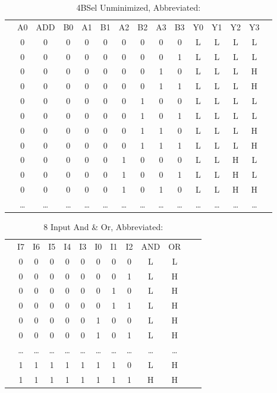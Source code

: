 \documentclass[letterpaper,titlepage,oneside]{article}
\begin{document}
\begin{table}[h!]
\begin{center}

\caption{4BSel Unminimized, Abbreviated: }\label{table:4BSel_Unminimized}
\begin{tabular}{c|c|c|c|c|c|c|c|c|c|c|c|c|c|c}
\cline{2-14}
 & A0 & ADD & B0 & A1 & B1 & A2 & B2 & A3 & B3 & Y0 & Y1 & Y2 & Y3 &  \\ \cline{2-14}

 & 0 & 0 & 0 & 0 & 0 & 0 & 0 & 0 & 0 & L & L & L & L\\
 & 0 & 0 & 0 & 0 & 0 & 0 & 0 & 0 & 1 & L & L & L & L\\
 & 0 & 0 & 0 & 0 & 0 & 0 & 0 & 1 & 0 & L & L & L & H\\
 & 0 & 0 & 0 & 0 & 0 & 0 & 0 & 1 & 1 & L & L & L & H\\
 & 0 & 0 & 0 & 0 & 0 & 0 & 1 & 0 & 0 & L & L & L & L\\
 & 0 & 0 & 0 & 0 & 0 & 0 & 1 & 0 & 1 & L & L & L & L\\
 & 0 & 0 & 0 & 0 & 0 & 0 & 1 & 1 & 0 & L & L & L & H\\
 & 0 & 0 & 0 & 0 & 0 & 0 & 1 & 1 & 1 & L & L & L & H\\
 & 0 & 0 & 0 & 0 & 0 & 1 & 0 & 0 & 0 & L & L & H & L\\
 & 0 & 0 & 0 & 0 & 0 & 1 & 0 & 0 & 1 & L & L & H & L\\
 & 0 & 0 & 0 & 0 & 0 & 1 & 0 & 1 & 0 & L & L & H & H\\
 & \ldots{} & \ldots{} & \ldots{} & \ldots{} & \ldots{} & \ldots{} & %
\ldots{} & \ldots{} & \ldots{} & \ldots{} & \ldots{} & \ldots{} & \ldots{} &\\
\cline{2-14}
\end{tabular}
\end{center}
\end{table}

\begin{table}[h!]
\begin{center}
\caption{8 Input And \& Or, Abbreviated: }\label{8AndOr_Unminimized}
\begin{tabular}{c|c|c|c|c|c|c|c|c|c|c|c|c}
\cline{2-11}
& I7 & I6 & I5 & I4 & I3 & I0 & I1 & I2 & AND & OR \\ 
\cline{2-11}
& 0 & 0 & 0 & 0 & 0 & 0 & 0 & 0 & L & L  \\  
& 0 & 0 & 0 & 0 & 0 & 0 & 0 & 1 & L & H \\
& 0 & 0 & 0 & 0 & 0 & 0 & 1 & 0 & L & H \\
& 0 & 0 & 0 & 0 & 0 & 0 & 1 & 1 & L & H \\
& 0 & 0 & 0 & 0 & 0 & 1 & 0 & 0 & L & H \\
& 0 & 0 & 0 & 0 & 0 & 1 & 0 & 1 & L & H \\
& \ldots{} & \ldots{} & \ldots{} & \ldots{} & \ldots{} & \ldots{} & %
\ldots{} & \ldots{} & \ldots{} & \ldots{}\\
& 1 & 1 & 1 & 1 & 1 & 1 & 1 & 0 & L & H \\
& 1 & 1 & 1 & 1 & 1 & 1 & 1 & 1 & H & H \\
\cline{2-11}
\end{tabular}
\end{center}
\end{table}
\end{document}

